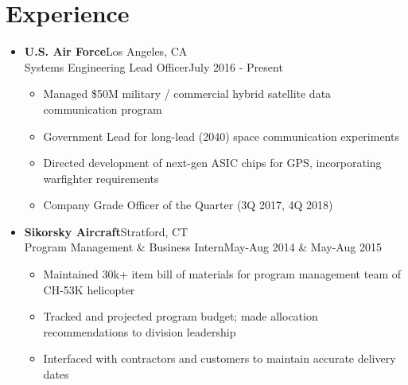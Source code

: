 \documentclass{article}
\begin{document}

\section{Experience} 
\begin{itemize}
    \itemsep0.2em
    \item \textbf{U.S. Air Force}\hfill Los Angeles, CA\\Systems Engineering Lead Officer\hfill July 2016 - Present
    \vspace{-\topsep} \vspace{0.2em}
    \begin{itemize}
        \itemsep0em
        \item Managed \$50M military / commercial hybrid satellite data communication program
        \item Government Lead for long-lead (2040) space communication experiments
        \item Directed development of next-gen ASIC chips for GPS, incorporating warfighter requirements
        \item Company Grade Officer of the Quarter (3Q 2017, 4Q 2018)
    \end{itemize}
    
    \item \textbf{Sikorsky Aircraft}\hfill Stratford, CT\\Program Management \& Business Intern\hfill May-Aug 2014 \& May-Aug 2015
    \vspace{-\topsep} \vspace{0.2em}
    \begin{itemize}
        \itemsep0em
        \item Maintained 30k+ item bill of materials for program management team of CH-53K helicopter
        \item Tracked and projected program budget; made allocation recommendations to division leadership
        \item Interfaced with contractors and customers to maintain accurate delivery dates
    \end{itemize}
    

\end{itemize}
\end{document}
